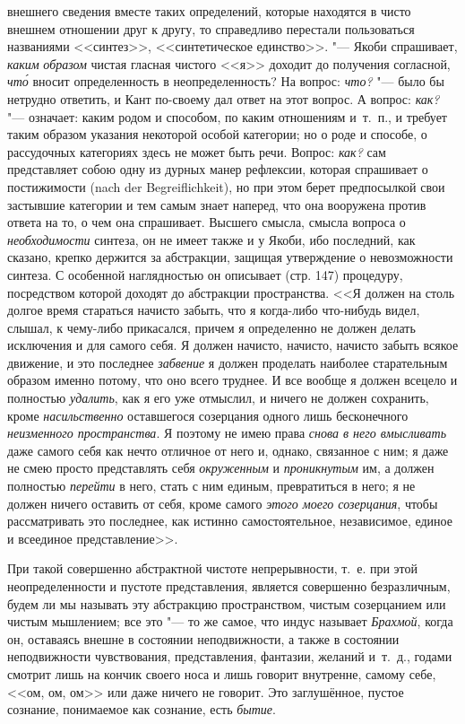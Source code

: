 внешнего сведения вместе таких определений, которые находятся в чисто
внешнем отношении друг к другу, то справедливо перестали пользоваться
названиями <<синтез>>, <<синтетическое единство>>. "--- Якоби спрашивает,
{\em каким} {\em образом} чистая
гласная чистого <<я>> доходит до получения согласной,
{\em чт\'{о}} вносит определенность в неопределенность? На
вопрос: {\em что?} "--- было бы нетрудно ответить, и Кант
по-своему дал ответ на этот вопрос. А вопрос:
{\em как?} "--- означает: каким родом и способом, по каким
отношениям и~т.~п., и требует таким образом указания некоторой особой
категории; но о роде и способе, о рассудочных категориях здесь не может
быть речи. Вопрос: {\em как?} сам представляет собою
одну из дурных манер рефлексии, которая спрашивает о постижимости (nach der
Begreiflichkeit), но при этом берет предпосылкой свои застывшие категории и
тем самым знает наперед, что она вооружена против ответа на то, о чем она
спрашивает. Высшего смысла, смысла вопроса о
{\em необходимости} синтеза, он не имеет также и у
Якоби, ибо последний, как сказано, крепко держится за абстракции, защищая
утверждение о невозможности синтеза. С особенной наглядностью он описывает
(стр. 147) процедуру, посредством которой доходят до абстракции
пространства. <<Я должен на столь долгое время стараться начисто забыть, что
я когда-либо что-нибудь видел, слышал, к чему-либо прикасался, причем я
определенно не должен делать исключения и для самого себя. Я должен
начисто, начисто, начисто забыть всякое движение, и это последнее
{\em забвение} я должен проделать наиболее старательным
образом именно потому, что оно всего труднее. И все вообще я должен всецело
и полностью {\em удалить}, как я его уже отмыслил, и
ничего не должен сохранить, кроме {\em насильственно}
оставшегося созерцания одного лишь бесконечного
{\em неизменного пространства}. Я поэтому не имею права
{\em снова в него вмысливать} даже самого себя как
нечто отличное от него и, однако, связанное с ним; я даже не смею просто
представлять себя {\em окруженным} и
{\em проникнутым} им, а должен полностью
{\em перейти} в него, стать с ним единым, превратиться
в него; я не должен ничего оставить от себя, кроме самого
{\em этого моего созерцания}, чтобы рассматривать это
последнее, как истинно самостоятельное, независимое, единое и всеединое
представление>>.

При такой совершенно абстрактной чистоте непрерывности, т.~е. при этой
неопределенности и пустоте представления, является совершенно безразличным,
будем ли мы называть эту абстракцию пространством, чистым созерцанием или
чистым мышлением; все это "--- то же самое, что индус называет
{\em Брахмой}, когда он, оставаясь внешне в состоянии
неподвижности, а также в состоянии неподвижности чувствования,
представления, фантазии, желаний и~т.~д., годами смотрит лишь на кончик
своего носа и лишь говорит внутренне, самому себе, <<ом, ом, ом>> или даже
ничего не говорит. Это заглушённое, пустое сознание, понимаемое как
сознание, есть {\em бытие}.

